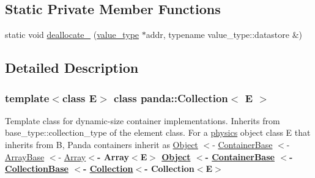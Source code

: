 \subsection*{Static Private Member Functions}
\begin{DoxyCompactItemize}
\item 
static void \hyperlink{classpanda_1_1Collection_a74432be483a033e44ee2c7860487b20c}{deallocate\_\-} (\hyperlink{classpanda_1_1Collection_a9df859281619e6213192b6f7af902d76}{value\_\-type} $\ast$addr, typename value\_\-type::datastore \&)
\end{DoxyCompactItemize}


\subsection{Detailed Description}
\subsubsection*{template$<$class E$>$ class panda::Collection$<$ E $>$}

Template class for dynamic-\/size container implementations. Inherits from base\_\-type::collection\_\-type of the element class. For a \hyperlink{namespacepanda_1_1physics}{physics} object class E that inherits from B, Panda containers inherit as \hyperlink{classpanda_1_1Object}{Object} $<$-\/ \hyperlink{classpanda_1_1ContainerBase}{ContainerBase} $<$-\/ \hyperlink{classpanda_1_1ArrayBase}{ArrayBase} $<$-\/ \hyperlink{classpanda_1_1Array}{Array}{\bfseries  $<$-\/ Array$<$E$>$ \hyperlink{classpanda_1_1Object}{Object} $<$-\/ \hyperlink{classpanda_1_1ContainerBase}{ContainerBase} $<$-\/ \hyperlink{classpanda_1_1CollectionBase}{CollectionBase} $<$-\/ \hyperlink{classpanda_1_1Collection}{Collection}{\bfseries  $<$-\/ Collection$<$E$>$ }}

